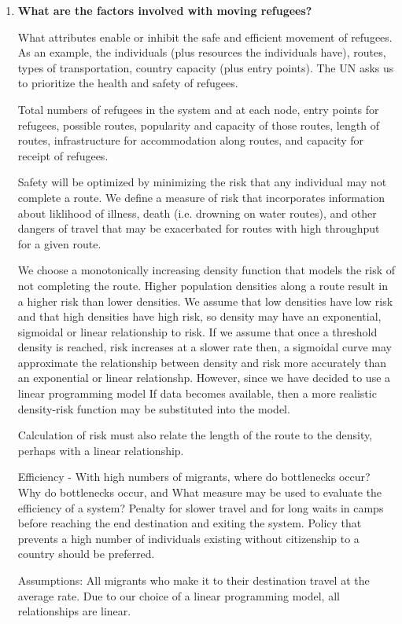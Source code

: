\documentclass{article}
\begin{document}
\begin{enumerate}
    \item {\bf What are the factors involved with moving refugees?}

    What attributes enable or inhibit the safe and efficient movement of refugees. As an example, the individuals (plus resources the individuals have), routes, types of transportation, country capacity (plus entry points). The UN asks us to prioritize the health and safety of refugees.

    Total numbers of refugees in the system and at each node, entry points for refugees, possible routes, popularity and capacity of those routes, length of routes, infrastructure for accommodation along routes, and capacity for receipt of refugees.

    Safety will be optimized by minimizing the risk that any individual may not complete a route. We define a measure of risk that incorporates information about liklihood of illness, death (i.e. drowning on water routes), and other dangers of travel that may be exacerbated for routes with high throughput for a given route. 

    We choose a monotonically increasing density function that models the risk of not completing the route. Higher population densities along a route result in a higher risk than lower densities. We assume that low densities have low risk and that high densities have high risk, so density may have an exponential, sigmoidal or linear relationship to risk. If we assume that once a threshold density is reached, risk increases at a slower rate then, a sigmoidal curve may approximate the relationship between density and risk more accurately than an exponential or linear relationshp. However, since we have decided to use a linear programming model  If data becomes available, then a more realistic density-risk function may be substituted into the model.

    Calculation of risk must also relate the length of the route to the density, perhaps with a linear relationship. 

    Efficiency - With high numbers of migrants, where do bottlenecks occur? Why do bottlenecks occur, and  What measure may be used to evaluate the efficiency of a system? Penalty for slower travel and for long waits in camps before reaching the end destination and exiting the system. Policy that prevents a high number of individuals existing without citizenship to a country should be preferred.

    Assumptions: All migrants who make it to their destination travel at the average rate. Due to our choice of a linear programming model, all relationships are linear. 


\end{enumerate}
\end{document}
